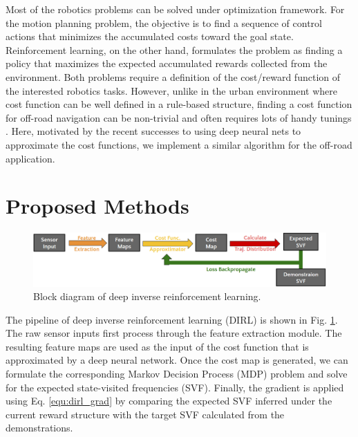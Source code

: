 \documentclass[../thesis.tex]{subfiles}
\begin{document}
 
 
 
Most of the robotics problems can be solved under optimization framework.
For the motion planning problem, the objective is to find a sequence of control actions that minimizes the accumulated costs toward the goal state.
Reinforcement learning, on the other hand, formulates the problem as finding a policy that maximizes the expected accumulated rewards collected from the environment.
Both problems require a definition of the cost/reward function of the interested robotics tasks.
However, unlike in the urban environment where cost function can be well defined in a rule-based structure, finding a cost function for off-road navigation can be non-trivial and often requires lots of handy tunings \cite{silver2010learning}.
Here, motivated by the recent successes \cite{wulfmeier2015maximum,wulfmeier2016watch} to using deep neural nets to approximate the cost functions, we implement a similar algorithm for the off-road application.
 
 
\section{Proposed Methods}
 
\begin{figure}[t]
        \begin{center}
         \centerline{\includegraphics[width=\columnwidth]{./DIRL/fig/dirl_diagram.png}}
               \caption{Block diagram of deep inverse reinforcement learning.}
               \label{fig:dirl_diagram}
        \end{center}
        \vskip -0.2in
\end{figure}
 
The pipeline of deep inverse reinforcement learning (DIRL) is shown in Fig. \ref{fig:dirl_diagram}.
The raw sensor inputs first process through the feature extraction module.
The resulting feature maps are used as the input of the cost function that is approximated by a deep neural network.
Once the cost map is generated, we can formulate the corresponding Markov Decision Process (MDP) problem and solve for the expected state-visited frequencies (SVF).
Finally, the gradient is applied using Eq. \ref{equ:dirl_grad} by comparing the expected SVF inferred under the current reward structure with the target SVF calculated from the demonstrations.
 
\end{document}
